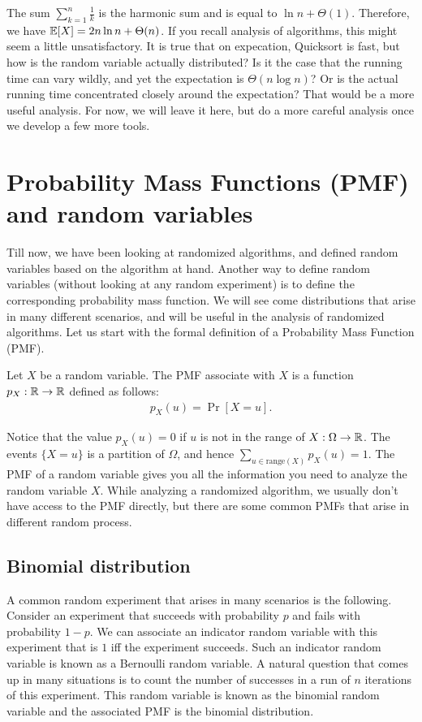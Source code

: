 The sum $\sum_{k=1}^n \frac{1}{k}$ is the harmonic sum and is equal to $\ln n +\Theta(1)$. Therefore, we have $\mathbb{E}[X] = 2n\ln n + \Theta(n)$. If you recall analysis of algorithms, this might seem a little unsatisfactory. It is true that on expecation, Quicksort is fast, but how is the random variable actually distributed? Is it the case that the running time can vary wildly, and yet the expectation is $\Theta(n\log n)$? Or is the actual running time concentrated closely around the expectation? That would be a more useful analysis. For now, we will leave it here, but do a more careful analysis once we develop a few more tools.

\section{Probability Mass Functions (PMF) and random variables}

Till now, we have been looking at randomized algorithms, and defined random variables based on the algorithm at hand. Another way to define random variables (without looking at any random experiment) is to define the corresponding probability mass function. We will see come distributions that arise in many different scenarios, and will be useful in the analysis of randomized algorithms. Let us start with the formal definition of a Probability Mass Function (PMF).

\begin{definition}
	Let $X$ be a random variable. The PMF associate with $X$ is a function $p_X:\mathbb{R} \to \mathbb{R}$ defined as follows:
	\begin{align*}
		p_X(u) = \Pr[X=u].
	\end{align*}
	\label{defn:pmf}
\end{definition}

Notice that the value $p_X(u)=0$ if $u$ is not in the range of $X:\Omega \to \mathbb{R}$. The events $\{X = u\}$ is a partition of $\Omega$, and hence $\sum_{u \in \text{range}(X)} p_X(u) = 1$. The PMF of a random variable gives you all the information you need to analyze the random variable $X$. While analyzing a randomized algorithm, we usually don't have access to the PMF directly, but there are some common PMFs that arise in different random process. 

\subsection{Binomial distribution}

A common random experiment that arises in many scenarios is the following. Consider an experiment that succeeds with probability $p$ and fails with probability $1-p$. We can associate an indicator random variable with this experiment that is $1$ iff the experiment succeeds. Such an indicator random variable is known as a Bernoulli random variable. A natural question that comes up in many situations is to count the number of successes in a run of $n$ iterations of this experiment. This random variable is known as the binomial random variable and the associated PMF is the binomial distribution.

